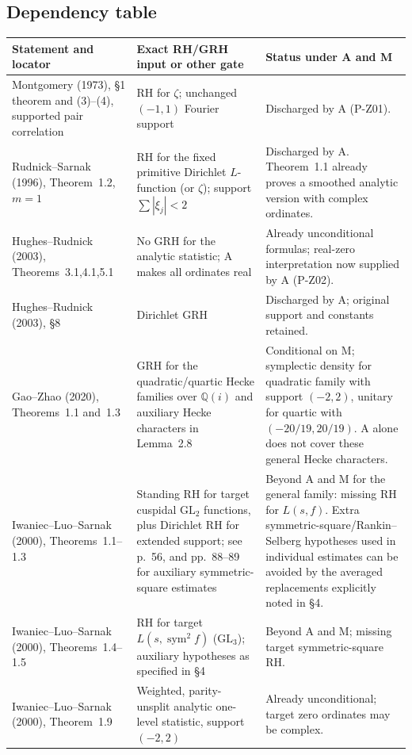 \subsection{Dependency table}
\begingroup\small
\begin{longtable}{p{}p{}p{}}
\hline
Statement and locator & Exact RH/GRH input or other gate & Status under A and M\\\hline
Montgomery (1973), \S1 theorem and (3)--(4), supported pair correlation & RH for $\zeta$; unchanged $(-1,1)$ Fourier support & Discharged by A (P-Z01).\\
Rudnick--Sarnak (1996), Theorem~1.2, $m=1$ & RH for the fixed primitive Dirichlet $L$-function (or $\zeta$); support $\sum|\xi_j|<2$ & Discharged by A. Theorem~1.1 already proves a smoothed analytic version with complex ordinates.\\
Hughes--Rudnick (2003), Theorems~3.1,4.1,5.1 & No GRH for the analytic statistic; A makes all ordinates real & Already unconditional formulas; real-zero interpretation now supplied by A (P-Z02).\\
Hughes--Rudnick (2003), \S8 & Dirichlet GRH & Discharged by A; original support and constants retained.\\
Gao--Zhao (2020), Theorems~1.1 and~1.3 & GRH for the quadratic/quartic Hecke families over $\mathbb Q(i)$ and auxiliary Hecke characters in Lemma~2.8 & Conditional on M; symplectic density for quadratic family with support $(-2,2)$, unitary for quartic with $(-20/19,20/19)$. A alone does not cover these general Hecke characters.\\
Iwaniec--Luo--Sarnak (2000), Theorems~1.1--1.3 & Standing RH for target cuspidal $\mathrm{GL}_2$ functions, plus Dirichlet RH for extended support; see p.~56, and pp.~88--89 for auxiliary symmetric-square estimates & Beyond A and M for the general family: missing RH for $L(s,f)$. Extra symmetric-square/Rankin--Selberg hypotheses used in individual estimates can be avoided by the averaged replacements explicitly noted in \S4.\\
Iwaniec--Luo--Sarnak (2000), Theorems~1.4--1.5 & RH for target $L(s,\operatorname{sym}^2f)$ ($\mathrm{GL}_3$); auxiliary hypotheses as specified in \S4 & Beyond A and M; missing target symmetric-square RH.\\
Iwaniec--Luo--Sarnak (2000), Theorem~1.9 & Weighted, parity-unsplit analytic one-level statistic, support $(-2,2)$ & Already unconditional; target zero ordinates may be complex.\\

\end{longtable}
